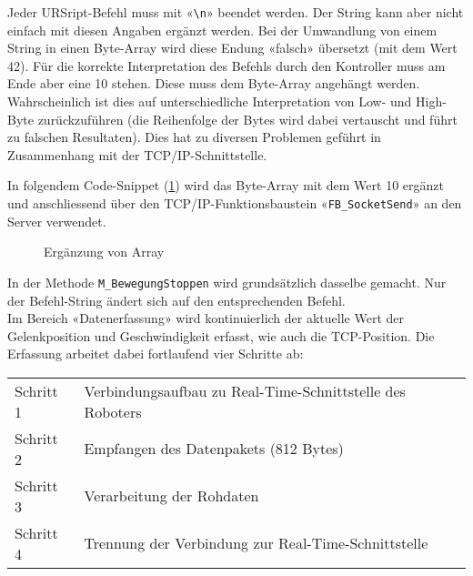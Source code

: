 		\begin{bfhNoteBox}
			Jeder URSript-Befehl muss mit «\verb|\n|» beendet werden. Der String kann aber nicht einfach mit diesen Angaben ergänzt werden. Bei der Umwandlung von einem String in einen Byte-Array wird diese Endung «falsch» übersetzt (mit dem Wert 42). Für die korrekte Interpretation des Befehls durch den Kontroller muss am Ende aber eine 10 stehen. Diese muss dem Byte-Array angehängt werden. Wahrscheinlich ist dies auf unterschiedliche Interpretation von Low- und High-Byte zurückzuführen (die Reihenfolge der Bytes wird dabei vertauscht und führt zu falschen Resultaten). Dies hat zu diversen Problemen geführt in Zusammenhang mit der TCP/IP-Schnittstelle.
		\end{bfhNoteBox}
		
		In folgendem Code-Snippet (\ref{fig:ArrayErgänzung}) wird das Byte-Array mit dem Wert 10 ergänzt und anschliessend über den TCP/IP-Funktionsbaustein «\verb|FB_SocketSend|» an den Server verwendet. 
		
		\begin{figure}[h!]
			\centering
			\captionsetup{justification=centering}
			\caption{Ergänzung von Array}
			\label{fig:ArrayErgänzung}
		\end{figure}
		
		In der Methode \verb|M_BewegungStoppen| wird grundsätzlich dasselbe gemacht. Nur der Befehl-String ändert sich auf den entsprechenden Befehl.
		\\
		Im Bereich «Datenerfassung» wird kontinuierlich der aktuelle Wert der Gelenkposition und Geschwindigkeit erfasst, wie auch die TCP-Position. Die Erfassung arbeitet dabei fortlaufend vier Schritte ab:
		
		\begin{tabularx}{\textwidth}{@{}>{}p{8em} X@{}}
			Schritt 1 & 
			Verbindungsaufbau zu Real-Time-Schnittstelle des Roboters
			\\
			Schritt 2 & 
			Empfangen des Datenpakets (812 Bytes)
			\\
			Schritt 3 & 
			Verarbeitung der Rohdaten   
			\\
			Schritt 4 & 
			Trennung der Verbindung zur Real-Time-Schnittstelle
			\\
		\end{tabularx}
		\\
		
